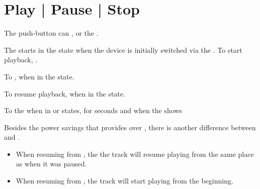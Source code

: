 \section{Play | Pause | Stop} \label{Audio - Play|Pause|Stop}

The \thinspace\sPl\enspace push-button can ,  or 
the .

\par\medskip

The  starts in the  state when the device is initially switched
 via the .  To start playback, .


To ,  when in the  state.


To resume playback,  when in the  state.


To  the  when in  or  states,  for
 seconds and  when the  shows

\begin{figure}[H]
\centering
\end{figure}


Besides the power savings that  provides over ,
there is another difference between  and .

\begin{itemize}
  \item When resuming from , the the track will resume playing from
    the same place as when it was paused.
  \item When resuming from , the track will start playing from the
    beginning.
\end{itemize}

